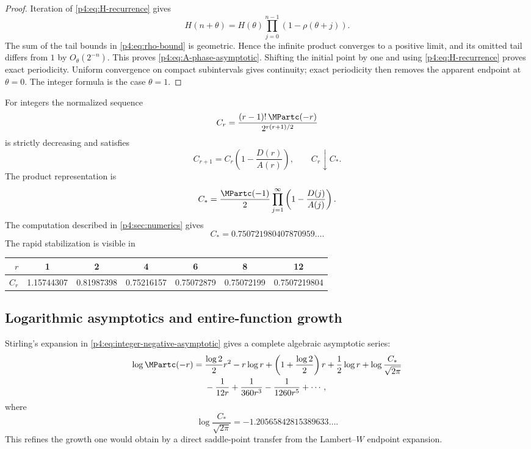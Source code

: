 \documentclass[11pt,oneside]{article}
\theoremstyle{definition}
\theoremstyle{remark}
\newcommand{\1}{\mathbf 1}
\begin{document}
\begin{proof}
Iteration of \cref{p4:eq:H-recurrence} gives
\[
 H(n+\theta)=H(\theta)
 \prod_{j=0}^{n-1}(1-\rho(\theta+j)).
\]
The sum of the tail bounds in \cref{p4:eq:rho-bound} is geometric.  Hence the infinite
product converges to a positive limit, and its omitted tail differs from \(1\) by
\(O_\theta(2^{-n})\).  This proves \cref{p4:eq:A-phase-asymptotic}.  Shifting the
initial point by one and using \cref{p4:eq:H-recurrence} proves exact periodicity.
Uniform convergence on compact subintervals gives continuity; exact periodicity
then removes the apparent endpoint at \(\theta=0\).
The integer formula is the case \(\theta=1\).
\end{proof}

For integers the normalized sequence
\begin{equation}\label{p4:eq:Cr-def}
 C_r=\frac{(r-1)!\,\MPartc(-r)}{2^{r(r+1)/2}}
\end{equation}
is strictly decreasing and satisfies
\begin{equation}\label{p4:eq:Cr-rec}
 C_{r+1}=C_r\left(1-\frac{D(r)}{A(r)}\right),
 \qquad C_r\downarrow C_*.
\end{equation}
The product representation is
\begin{equation}\label{p4:eq:Cstar-product}
 C_*=\frac{\MPartc(-1)}2
 \prod_{j=1}^{\infty}
 \left(1-\frac{D(j)}{A(j)}\right).
\end{equation}
The computation described in \cref{p4:sec:numerics} gives
\begin{equation}\label{p4:eq:Cstar-numeric}
 C_*=0.750721980407870959\ldots.
\end{equation}
The rapid stabilization is visible in
\begin{center}
\small
\begin{tabular}{@{}rcccccc@{}}
\toprule
\(r\)&1&2&4&6&8&12\\
\midrule
\(C_r\)&1.15744307&0.81987398&0.75216157&0.75072879&
0.75072199&0.7507219804\\
\bottomrule
\end{tabular}
\end{center}

\subsection{Logarithmic asymptotics and entire-function growth}

Stirling's expansion in \cref{p4:eq:integer-negative-asymptotic} gives a complete
algebraic asymptotic series:
\begin{align}
 \log\MPartc(-r)
 ={}&\frac{\log2}{2}r^2-r\log r
 +\left(1+\frac{\log2}{2}\right)r
 +\frac12\log r
 +\log\frac{C_*}{\sqrt{2\pi}}
 \nonumber\\
 &-\frac1{12r}+\frac1{360r^3}-\frac1{1260r^5}+\cdots,
 \label{p4:eq:log-negative-asymptotic}
\end{align}
where
\begin{equation}\label{p4:eq:log-Cstar-numeric}
 \log\frac{C_*}{\sqrt{2\pi}}
 =-1.20565842815389633\ldots.
\end{equation}
This refines the growth one would obtain by a direct saddle-point transfer from the
Lambert--\(W\) endpoint expansion.
\end{document}
